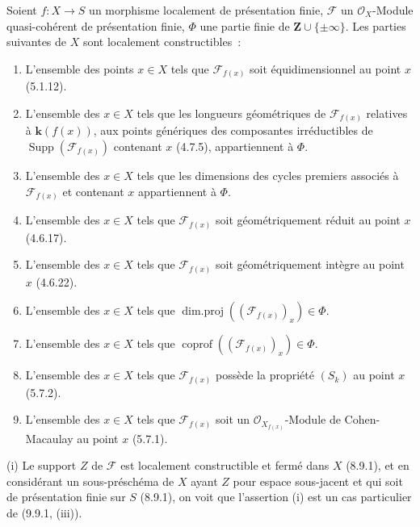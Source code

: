 \begin{proposition}[9.9.2]
\label{IV.9.9.2-fr}
Soient $f:X\to S$ un morphisme localement de présentation finie, $\mathcal F$
un $\mathcal O_X$-Module quasi-cohérent de présentation finie, $\Phi$ une
partie finie de $\mathbf Z\cup\{\pm\infty\}$. Les parties suivantes de $X$
sont localement constructibles~:
\begin{enumerate}
\item[\textup{(i)}] L'ensemble des points $x\in X$ tels que $\mathcal F_{f(x)}$ soit
équidimensionnel au point $x$ \textup{(5.1.12)}.
\item[\textup{(ii)}] L'ensemble des $x\in X$ tels que les longueurs géométriques de
$\mathcal F_{f(x)}$ relatives à $\boldsymbol{k}(f(x))$, aux points génériques des composantes
irréductibles de $\operatorname{Supp}(\mathcal F_{f(x)})$ contenant $x$
\textup{(4.7.5)}, appartiennent à $\Phi$.
\item[\textup{(iii)}] L'ensemble des $x\in X$ tels que les dimensions des cycles
premiers associés à $\mathcal F_{f(x)}$ et contenant $x$ appartiennent à
$\Phi$.
\item[\textup{(iv)}] L'ensemble des $x\in X$ tels que $\mathcal F_{f(x)}$ soit
géométriquement réduit au point $x$ \textup{(4.6.17)}.
\item[\textup{(v)}] L'ensemble des $x\in X$ tels que $\mathcal F_{f(x)}$ soit
géométriquement intègre au point $x$ \textup{(4.6.22)}.
\item[\textup{(vi)}] L'ensemble des $x\in X$ tels que
$\operatorname{dim.proj}((\mathcal F_{f(x)})_x)\in\Phi$.
\item[\textup{(vii)}] L'ensemble des $x\in X$ tels que
$\operatorname{coprof}((\mathcal F_{f(x)})_x)\in\Phi$.
\item[\textup{(viii)}] L'ensemble des $x\in X$ tels que $\mathcal F_{f(x)}$ possède la
propriété $(S_k)$ au point $x$ \textup{(5.7.2)}.
\item[\textup{(ix)}] L'ensemble des $x\in X$ tels que $\mathcal F_{f(x)}$ soit un
$\mathcal O_{X_{f(x)}}$-Module de Cohen-Macaulay au point $x$ \textup{(5.7.1)}.
\end{enumerate}
\end{proposition}

(i) Le support $Z$ de $\mathcal F$ est localement constructible et fermé dans
$X$ (8.9.1), et en considérant un sous-préschéma de $X$ ayant $Z$ pour espace
sous-jacent et qui soit de présentation finie sur $S$ (8.9.1), on voit que
l'assertion (i) est un cas particulier de (9.9.1, (iii)).

